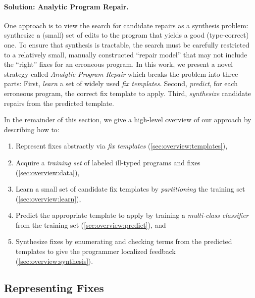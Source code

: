 \paragraph{Solution: Analytic Program Repair.}
%
One approach is to view the search for candidate repairs
as a synthesis problem: synthesize a (small) set of edits
to the program that yields a good (\eg type-correct) one.
%
To ensure that synthesis is tractable, the search must be
carefully restricted to a relatively small, manually constructed
``repair model'' that may not include the ``right'' fixes for
an erroneous program.
%
In this work, we present a novel strategy called
\emph{Analytic Program Repair} which breaks the
problem into three parts:
%
First, \emph{learn} a set of widely used \emph{fix templates}.
%
Second, \emph{predict}, for each erroneous program, the correct fix template to apply.
%
Third, \emph{synthesize} candidate repairs from the predicted template.

In the remainder of this section, we give a high-level overview
of our approach by describing how to:

\begin{enumerate}

  \item Represent fixes abstractly via \emph{fix templates}
        (\autoref{sec:overview:templates}),

  \item Acquire a \emph{training set} of labeled ill-typed programs and fixes
        (\autoref{sec:overview:data}),

  \item Learn a small set of candidate fix templates by \emph{partitioning}
        the training set (\autoref{sec:overview:learn}),

  \item Predict the appropriate template to apply by training a
        \emph{multi-class classifier} from the training set
        (\autoref{sec:overview:predict}), and

  \item Synthesize fixes by enumerating and checking terms from the
        predicted templates to give the programmer localized feedback
        (\autoref{sec:overview:synthesis}).
\end{enumerate}

\subsection{Representing Fixes}
\label{sec:overview:templates}

